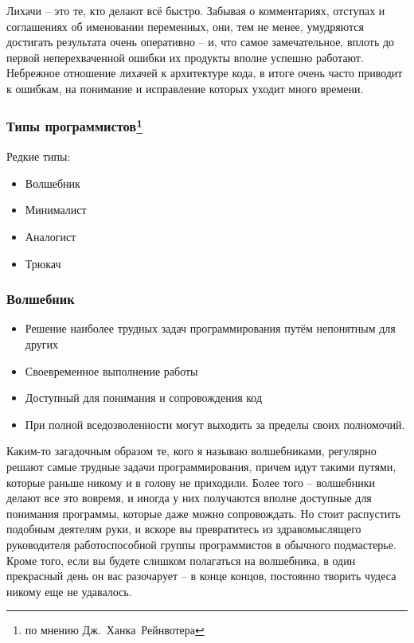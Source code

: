 \documentclass{../industrial-development}
\begin{document}
{\begin{frame}
\begin{itemize}
		\end{itemize}
\end{frame}
\lecturenotes
Лихачи – это те, кто делают всё быстро. Забывая о комментариях, отступах и соглашениях об именовании переменных, они, тем не менее, умудряются достигать результата очень оперативно – и, что самое замечательное, вплоть до первой неперехваченной ошибки их продукты вполне успешно работают. 
	 Небрежное отношение лихачей к архитектуре кода, в итоге очень часто приводит к ошибкам, на понимание и исправление которых уходит много времени.

\begin{frame} \frametitle{Типы программистов\footnote[1]{по мнению Дж.~Ханка~Рейнвотера}}
	\begin{block}{Редкие типы:}
\begin{itemize}
\item Волшебник
\item Минималист
\item Аналогист
\item Трюкач
\end{itemize}
\end{block}
\end{frame}
\lecturenotes

\begin{frame} \frametitle{Волшебник}
	\begin{itemize}
		\item Решение наиболее трудных задач программирования путём непонятным для других
		\item Своевременное выполнение работы
		\item Доступный для понимания и сопровождения код
		\item При полной вседозволенности могут выходить за пределы своих полномочий.
\end{itemize}
\end{frame}
\lecturenotes
Каким-то загадочным образом те, кого я называю волшебниками, регулярно решают самые трудные задачи программирования, причем идут такими путями, которые раньше никому и в голову не приходили. Более того – волшебники делают все это вовремя, и иногда у них получаются вполне доступные для понимания программы, которые даже можно сопровождать. 
Но стоит распустить подобным деятелям руки, и вскоре вы превратитесь из здравомыслящего руководителя работоспособной группы программистов в обычного подмастерье. Кроме того, если вы будете слишком полагаться на волшебника, в один прекрасный день он вас разочарует – в конце концов, постоянно творить чудеса никому еще не удавалось. 


}
\end{document}
